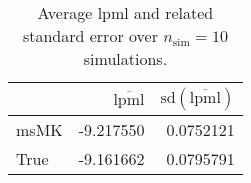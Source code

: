 \begin{table}[H]

\caption{Average lpml and related standard error over $n_{\text{sim}} = 10$ simulations.}
\centering
\begin{tabular}[t]{lrr}
\toprule
  & $\overbar{\text{lpml}}$ & $\text{sd}(\overbar{\text{lpml}})$\\
\midrule
msMK & -9.217550 & 0.0752121\\
True & -9.161662 & 0.0795791\\
\bottomrule
\end{tabular}
\end{table}